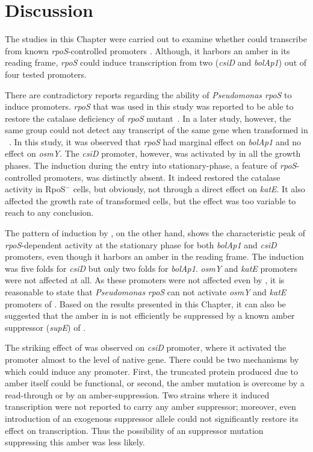 \section{Discussion}
\label{chap5:discussion}

The studies in this Chapter were carried out to examine whether
\lzsig{} could transcribe from known 
\emph{rpoS}-con\-trolled promoters . Although, it
harbors an amber in its reading frame, \emph{rpoS} could
induce transcription from two (\emph{csiD} and \emph{bolAp1}) out
of four tested promoters.

There are contradictory reports regarding the ability of
\emph{Pseudomonas rpoS} to induce  promoters. 
\emph{rpoS} that was used in this study was reported to be able to
restore the catalase deficiency of  \emph{rpoS}
mutant~\citep{Tanaka1994}. In a later study, however, the same
group could not detect any transcript of the same gene when
transformed in ~\citep{Fujita1994}. In this study, it was
observed that \emph{rpoS} had marginal effect on
\emph{bolAp1} and no effect on \emph{osmY}\@. The \emph{csiD}
promoter, however, was activated by \pasig{} in all the growth
phases. The induction during the entry into stationary-phase, a
feature of \emph{rpoS}-controlled promoters, was distinctly
absent. It indeed restored the catalase activity in RpoS$^{-}$
cells, but obviously, not through a direct effect on
\emph{katE}\@. It also affected the growth rate of transformed
cells, but the effect was too variable to reach to any conclusion.

The pattern of induction by \lzsig{}, on the other hand,  shows
the characteristic peak of \emph{rpoS}-dependent  activity
at the stationary phase for both \emph{bolAp1} and \emph{csiD}
promoters, even though it harbors an amber in the reading frame.
The induction was five folds for \emph{csiD} but only two folds
for \emph{bolAp1}. \emph{osmY} and \emph{katE} promoters were not
affected at all. As these promoters were not affected even by
\pasig{}, it is reasonable to state that \emph{Pseudomonas}
\emph{rpoS} can not activate \emph{osmY} and \emph{katE} promoters
of . Based on the results presented in this Chapter, it
can also be suggested that the amber in \lzsig{} is not
efficiently be suppressed by a known amber suppressor
(\emph{supE}) of .

The striking effect of \lzsig{} was observed on \emph{csiD}
promoter, where it activated the promoter almost to the level of
native  gene. There could be two mechanisms by which
\lzsig{} could induce any promoter. First, the truncated protein
produced due to amber itself could be functional, or second, the
amber mutation is overcome by a read-through or by an
amber-suppression. Two strains where it induced transcription were
not reported to carry any amber suppressor; moreover, even
introduction of an exogenous suppressor allele could not
significantly restore its effect on transcription. Thus the
possibility of an suppressor mutation suppressing this amber was
less likely.

